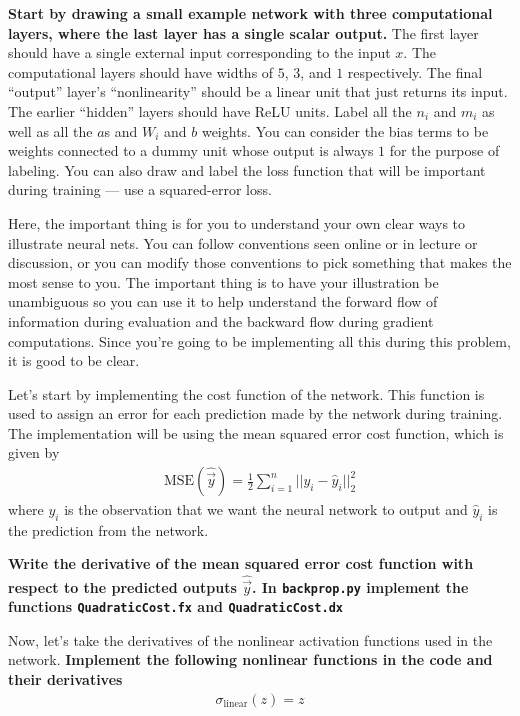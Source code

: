 \begin{Parts}
\Part 
{\bf Start by drawing a small example network with three computational layers, where the last layer has a single scalar output.} The first layer should have a single external input corresponding to the input $x$. The computational layers should have widths of $5$, $3$, and $1$ respectively. The final ``output'' layer's ``nonlinearity'' should be a linear unit that just returns its input. The earlier ``hidden'' layers should have ReLU units. Label all the $n_i$ and $m_i$ as well as all the $a$s and $W_i$ and $b$ weights. You can consider the bias terms to be weights connected to a dummy unit whose output is always $1$ for the purpose of labeling. You can also draw and label the loss function that will be important during training --- use a squared-error loss. 

Here, the important thing is for you to understand your own clear ways to illustrate neural nets. You can follow conventions seen online or in lecture or discussion, or you can modify those conventions to pick something that makes the most sense to you. The important thing is to have your illustration be unambiguous so you can use it to help understand the forward flow of information during evaluation and the backward flow during gradient computations. Since you're going to be implementing all this during this problem, it is good to be clear.

\Part
Let's start by implementing the cost function of the network.  This function is used to assign an error for each prediction made by the network during training.  The implementation will be using the mean squared error cost function, which is given by
\begin{align*}
\text{MSE}(\hat{\vec{y}})=\frac{1}{2}\sum_{i=1}^n\lvert\lvert y_i - \hat{y}_i\rvert\rvert_2^2
\end{align*}
where $y_i$ is the observation that we want the neural network to output and $\hat{y}_i$ is the prediction from the network.

\textbf{Write the derivative of the mean squared error cost function with respect to the predicted outputs $\hat{\vec{y}}$.  In \texttt{backprop.py} implement the functions \texttt{QuadraticCost.fx} and \texttt{QuadraticCost.dx}}



\Part Now, let's take the derivatives of the nonlinear activation functions used in the network.  \textbf{Implement the following nonlinear functions in the code and their derivatives}
\begin{align*}
\sigma_{\text{linear}}(z)=z
\end{align*}


\end{Parts}

